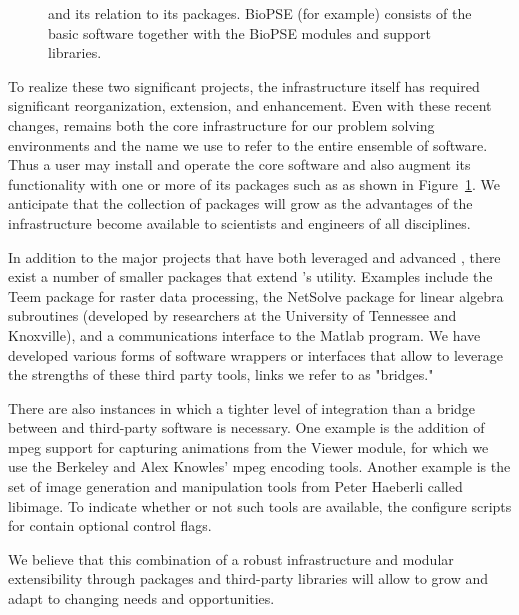 \begin{figure}[htb]
  \centering
  \begin{makeimage} \end{makeimage}
  \eabfig
  \caption{\label{fig:eab-BioPSE} \sr{} and its relation to its
    packages.  BioPSE (for example) consists of the basic \sr{}
    software together with the BioPSE modules and support libraries.}
\end{figure}

To realize these two significant projects, the \SR{} infrastructure
itself has required significant reorganization, extension, and
enhancement.  Even with these recent changes, \SR{} remains both the
core infrastructure for our problem solving environments and the name
we use to refer to the entire ensemble of software.  Thus a user may
install and operate the core \SR{} software and also augment its
functionality with one or more of its packages such as \BIOPSE{} as
shown in Figure~\ref{fig:eab-BioPSE}.  We anticipate that the
collection of packages will grow as the advantages of the \SR{}
infrastructure become available to scientists and engineers of all
disciplines.

In addition to the major projects that have both leveraged and
advanced \SR{}, there exist a number of smaller packages that extend
\SR{}'s utility.  Examples include the Teem package for raster data
processing, the NetSolve package for linear algebra subroutines
(developed by researchers at the University of Tennessee and
Knoxville), and a communications interface to the Matlab program.  We
have developed various forms of software wrappers or interfaces that
allow \SR{} to leverage the strengths of these third party tools,
links we refer to as "bridges."

There are also instances in which a tighter level of integration than a
bridge between \SR{} and third-party software is necessary.  One example
is the addition of mpeg support for capturing animations from the \SR{}
Viewer module, for which we use the Berkeley and Alex Knowles' mpeg
encoding tools.  Another example is the set of image generation and
manipulation tools from Peter Haeberli called libimage.  To indicate
whether or not such tools are available, the configure scripts for \SR{}
contain optional control flags.

We believe that this combination of a robust infrastructure and modular
extensibility through packages and third-party libraries will allow \SR{}
to grow and adapt to changing needs and opportunities. 


